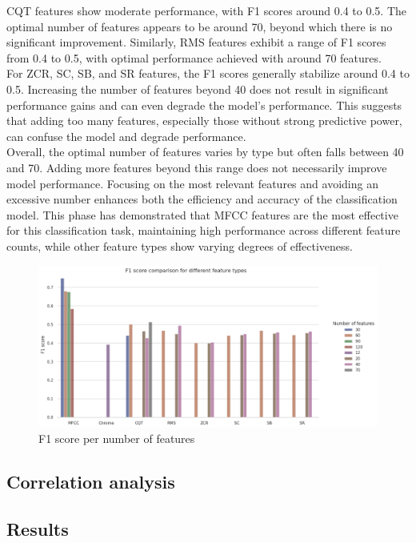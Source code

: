 CQT features show moderate performance, with F1 scores around 0.4 to 0.5. The optimal number of features appears to be around 70,
beyond which there is no significant improvement. Similarly, RMS features exhibit a range of F1 scores from 0.4 to 0.5,
with optimal performance achieved with around 70 features.\\
For ZCR, SC, SB, and SR features, the F1 scores generally stabilize around 0.4 to 0.5.
Increasing the number of features beyond 40 does not result in significant performance gains and can even degrade the model's performance.
This suggests that adding too many features, especially those without strong predictive power, can confuse the model and degrade performance.\\
Overall, the optimal number of features varies by type but often falls between 40 and 70.
Adding more features beyond this range does not necessarily improve model performance.
Focusing on the most relevant features and avoiding an excessive number enhances both the efficiency and accuracy of the classification model.
This phase has demonstrated that MFCC features are the most effective for this classification task,
maintaining high performance across different feature counts, while other feature types show varying degrees of effectiveness.

\begin{figure}[htbp]
    \centering
    \includegraphics[width=.8\textwidth]{../images/n_feature_per_type.png}
    \caption{F1 score per number of features}
    \label{fig:n_feature_per_type}
\end{figure}
\noindent
\subsection{Correlation analysis}


\subsection{Results}
